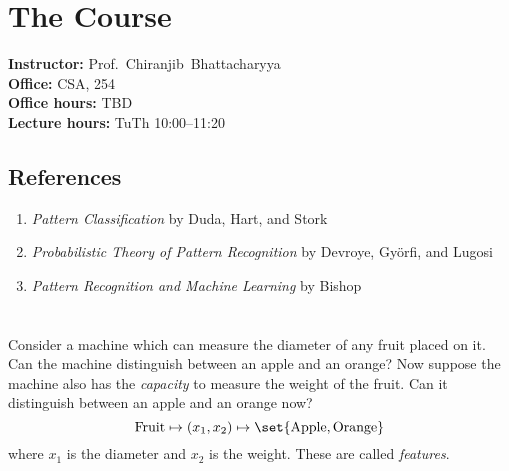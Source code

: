
\setcounter{section}{-1}
\section{The Course} \label{sec:course}
\textbf{Instructor:} Prof.~Chiranjib~Bhattacharyya \\
\textbf{Office:} CSA, 254 \\
\textbf{Office hours:} TBD\\
\textbf{Lecture hours:} TuTh 10:00--11:20

\subsection{References} \label{sec:references}
\begin{enumerate}
    \item \textit{Pattern Classification} by Duda, Hart, and Stork
    \item \textit{Probabilistic Theory of Pattern Recognition} by Devroye,
        Györfi, and Lugosi
    \item \textit{Pattern Recognition and Machine Learning} by Bishop
\end{enumerate}

\section{}
Consider a machine which can measure the diameter of any fruit placed on it.
Can the machine distinguish between an apple and an orange?
Now suppose the machine also has the \emph{capacity} to measure the weight
of the fruit.
Can it distinguish between an apple and an orange now?
\[
    \text{Fruit} \mapsto (x_1, x_2) \mapsto \set{\text{Apple}, \text{Orange}}
\] where $x_1$ is the diameter and $x_2$ is the weight.
These are called \emph{features}.

\begin{center}
\end{center}

